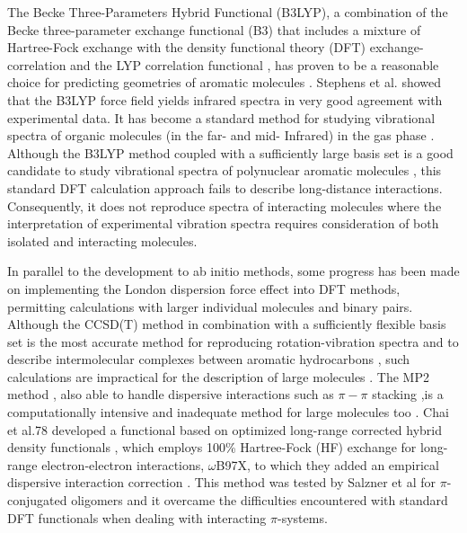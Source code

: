 The Becke Three-Parameters Hybrid Functional (B3LYP), a combination of the Becke three-parameter exchange functional (B3) \cite{becke1993density} that includes a mixture of Hartree-Fock exchange with the density functional theory (DFT) exchange-correlation and the LYP correlation functional \cite{lee1988development}, has proven to be a reasonable choice for predicting geometries of aromatic molecules \cite{bauschlicher1995comparison,tirado2008performance}.  Stephens et al. \cite{stephens1994ab} showed that the B3LYP force field yields infrared spectra in very good agreement with experimental data. It has become a standard method for studying vibrational spectra of organic molecules (in the far- and mid- Infrared) in the gas phase \cite{bauschlicher1997calculation,gohaud2005vibrational}. Although the B3LYP method coupled with a sufficiently large basis set is a good candidate to study vibrational spectra of polynuclear aromatic molecules \cite{michaelian2012far}, this standard DFT calculation approach fails to describe long-distance interactions. Consequently, it does not reproduce spectra of interacting molecules \cite{becke1993density,stephens1994ab,kristyan1994can,hobza1995density} where the interpretation of experimental vibration spectra requires consideration of both isolated and interacting molecules.

In parallel to the development to ab initio methods, some progress has been made on implementing the London dispersion force effect into DFT methods, permitting calculations with larger individual molecules and binary pairs. Although the CCSD(T) method in combination with a sufficiently flexible basis set is the most accurate method for reproducing rotation-vibration spectra and to describe intermolecular complexes between aromatic hydrocarbons \cite{begue2006new}, such calculations are impractical for the description of large molecules \cite{begue2012nitrile}. The MP2 method \cite{pople1979derivative}, also able to handle dispersive interactions such as $\pi-\pi$ stacking \cite{chalasinski2000state,johnson2006structure},is a computationally intensive and inadequate method for large molecules too \cite{eilmes2012theoretical}. Chai et al.78  developed a functional based on optimized long-range corrected hybrid density functionals \cite{chai2008systematic}, which employs 100\% Hartree-Fock (HF) exchange for long-range electron-electron interactions, $\omega$B97X, to which they added an empirical dispersive interaction correction \cite{eilmes2012theoretica}. This method was tested by Salzner et al \cite{salzner2011improved} for $\pi$-conjugated oligomers and it overcame the difficulties encountered with standard DFT functionals when dealing with interacting $\pi$-systems.

